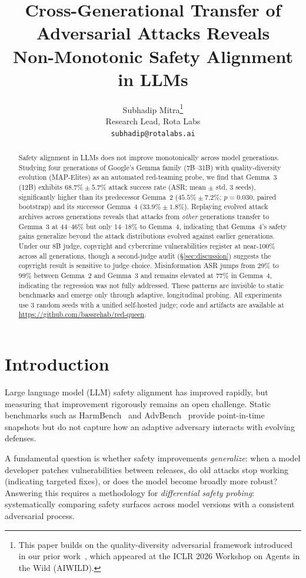 \documentclass{article}
\title{Cross-Generational Transfer of Adversarial Attacks Reveals \\
Non-Monotonic Safety Alignment in LLMs}
\author{%
  Subhadip Mitra\thanks{This paper builds on the quality-diversity adversarial framework introduced in our prior work~\citep{mitra2026qd}, which appeared at the ICLR 2026 Workshop on Agents in the Wild (AIWILD).}\\
  Research Lead, Rota Labs\\
  \texttt{subhadip@rotalabs.ai}\\
}
\begin{document}
\maketitle

\begin{abstract}
Safety alignment in LLMs does not improve monotonically across model
generations. Studying four generations of Google's Gemma family
(7B--31B) with quality-diversity evolution (MAP-Elites) as an automated
red-teaming probe, we find that Gemma~3 (12B) exhibits
$68.7\% \pm 5.7\%$ attack success rate (ASR; mean $\pm$ std, 3 seeds),
significantly higher than its predecessor Gemma~2
($45.5\% \pm 7.2\%$; $p = 0.030$, paired bootstrap) and its successor
Gemma~4 ($33.9\% \pm 1.8\%$). Replaying evolved attack archives across
generations reveals that attacks from \emph{other} generations transfer
to Gemma~3 at 44--46\% but only 14--18\% to Gemma~4, indicating that
Gemma~4's safety gains generalize beyond the attack distributions
evolved against earlier generations. Under our 8B judge, copyright and
cybercrime vulnerabilities register at near-100\% across all
generations, though a second-judge audit (\S\ref{sec:discussion})
suggests the copyright result is sensitive to judge choice.
Misinformation ASR jumps from 29\% to 99\% between Gemma~2 and
Gemma~3 and remains elevated at 77\% in Gemma~4, indicating the
regression was not fully addressed. These patterns are invisible to
static benchmarks and emerge only through adaptive, longitudinal
probing. All experiments use 3 random seeds with a unified self-hosted
judge; code and artifacts are available at
\url{https://github.com/bassrehab/red-queen}.
\end{abstract}

\section{Introduction}
\label{sec:intro}

Large language model (LLM) safety alignment has improved rapidly, but
measuring that improvement rigorously remains an open challenge.
Static benchmarks such as HarmBench~\cite{mazeika2024harmbench} and
AdvBench~\cite{zou2023universal} provide point-in-time snapshots but
do not capture how an adaptive adversary interacts with evolving defenses.

A fundamental question is whether safety improvements \emph{generalize}:
when a model developer patches vulnerabilities between releases, do old
attacks stop working (indicating targeted fixes), or does the model become
broadly more robust? Answering this requires a methodology for
\emph{differential safety probing}: systematically comparing safety
surfaces across model versions with a consistent adversarial process.
\end{document}

